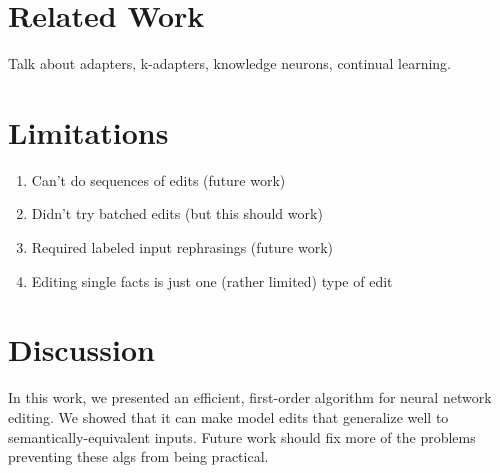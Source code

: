 \documentclass{article}
\begin{document}
\section{Related Work}
Talk about adapters, k-adapters, knowledge neurons, continual learning.
\section{Limitations}
\begin{enumerate}
    \item Can't do sequences of edits (future work)
    \item Didn't try batched edits (but this should work)
    \item Required labeled input rephrasings (future work)
    \item Editing single facts is just one (rather limited) type of edit
\end{enumerate}
\section{Discussion}
In this work, we presented an efficient, first-order algorithm for neural network editing. We showed that it can make model edits that generalize well to semantically-equivalent inputs. Future work should fix more of the problems preventing these algs from being practical.

\newpage


\end{document}
